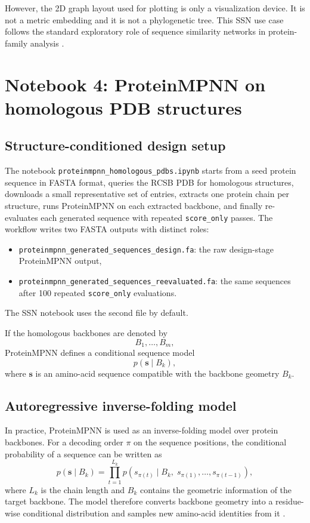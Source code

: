 \documentclass[11pt,a4paper]{article}
\begin{document}
However, the 2D graph layout used for plotting is only a visualization device. It is not a metric embedding and it is not a phylogenetic tree. This SSN use case follows the standard exploratory role of sequence similarity networks in protein-family analysis \cite{Atkinson2009,Gerlt2015,Oberg2023}.

\section{Notebook 4: ProteinMPNN on homologous PDB structures}

\subsection{Structure-conditioned design setup}

The notebook \texttt{proteinmpnn\_homologous\_pdbs.ipynb} starts from a seed protein sequence in FASTA format, queries the RCSB PDB for homologous structures, downloads a small representative set of entries, extracts one protein chain per structure, runs ProteinMPNN on each extracted backbone, and finally re-evaluates each generated sequence with repeated \texttt{score\_only} passes. The workflow writes two FASTA outputs with distinct roles:
\begin{itemize}[leftmargin=*]
\item \texttt{proteinmpnn\_generated\_sequences\_design.fa}: the raw design-stage ProteinMPNN output,
\item \texttt{proteinmpnn\_generated\_sequences\_reevaluated.fa}: the same sequences after 100 repeated \texttt{score\_only} evaluations.
\end{itemize}
The SSN notebook uses the second file by default.

If the homologous backbones are denoted by
\[
B_1,\dots,B_m,
\]
ProteinMPNN defines a conditional sequence model
\[
p(\bm{s}\mid B_k),
\]
where $\bm{s}$ is an amino-acid sequence compatible with the backbone geometry $B_k$.

\subsection{Autoregressive inverse-folding model}

In practice, ProteinMPNN is used as an inverse-folding model over protein backbones. For a decoding order $\pi$ on the sequence positions, the conditional probability of a sequence can be written as
\[
p(\bm{s}\mid B_k)=\prod_{t=1}^{L_k} p\!\left(s_{\pi(t)} \mid B_k,\; s_{\pi(1)},\dots,s_{\pi(t-1)}\right),
\]
where $L_k$ is the chain length and $B_k$ contains the geometric information of the target backbone. The model therefore converts backbone geometry into a residue-wise conditional distribution and samples new amino-acid identities from it \cite{Dauparas2022}.
\end{document}
